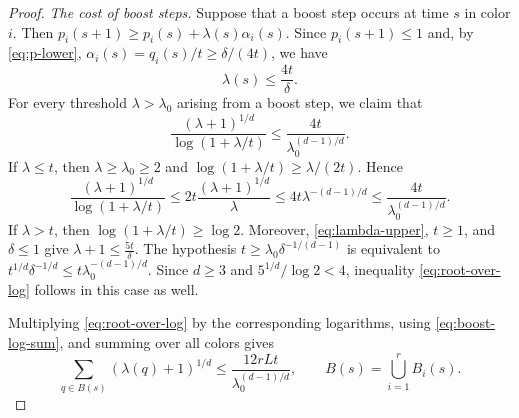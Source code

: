 \documentclass[twoside,12pt]{article}
\theoremstyle{definition}
\theoremstyle{remark}
\newcommand{\1}{\mathbf 1}
\begin{document}
\begin{proof}
\medskip
\noindent\emph{The cost of boost steps.}
Suppose that a boost step occurs at time $s$ in color $i$. Then
$
 p_i(s+1)\ge p_i(s)+\lambda(s)\alpha_i(s).
$
Since $p_i(s+1)\le1$ and, by \eqref{eq:p-lower},
$\alpha_i(s)=q_i(s)/t\ge\delta/(4t)$, we have
\begin{equation}\label{eq:lambda-upper}
 \lambda(s)\le\frac{4t}{\delta}.
\end{equation}
For every threshold $\lambda>\lambda_0$ arising from a boost step, we claim
that
\begin{equation}\label{eq:root-over-log}
 \frac{(\lambda+1)^{1/d}}
 {\log(1+\lambda/t)}
 \le\frac{4t}{\lambda_0^{(d-1)/d}}.
\end{equation}
If $\lambda\le t$, then $\lambda\ge\lambda_0\ge2$ and
$\log(1+\lambda/t)\ge\lambda/(2t)$. Hence
\[
 \frac{(\lambda+1)^{1/d}}{\log(1+\lambda/t)}
 \le2t\frac{(\lambda+1)^{1/d}}{\lambda}
 \le4t\lambda^{-(d-1)/d}
 \le\frac{4t}{\lambda_0^{(d-1)/d}}.
\]
If $\lambda>t$, then $\log(1+\lambda/t)\ge\log2$. Moreover,
\eqref{eq:lambda-upper}, $t\ge1$, and $\delta\le1$ give
$\lambda+1\le\frac{5t}{\delta}.
$
The hypothesis $t\ge\lambda_0\delta^{-1/(d-1)}$ is equivalent to
$t^{1/d}\delta^{-1/d}
 \le t\lambda_0^{-(d-1)/d}.
$
Since $d\ge3$ and $5^{1/d}/\log2<4$, inequality
\eqref{eq:root-over-log} follows in this case as well.

Multiplying \eqref{eq:root-over-log} by the corresponding logarithms, using
\eqref{eq:boost-log-sum}, and summing over all colors gives
\begin{equation}\label{eq:boost-root-sum}
 \sum_{q\in B(s)}(\lambda(q)+1)^{1/d}
 \le\frac{12rLt}{\lambda_0^{(d-1)/d}},
 \qquad
 B(s)=\bigcup_{i=1}^rB_i(s).
\end{equation}


\end{proof}
\end{document}
